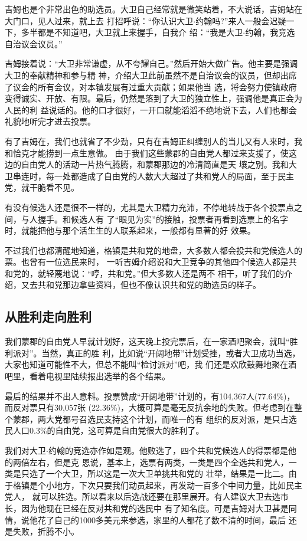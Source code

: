 ﻿\documentclass[11pt]{article}
\begin{document}
吉姆也是个非常出色的助选员。大卫自己经常就是微笑站着，不大说话，吉姆站在大门口，见人过来，就上去
打招呼说：``你认识大卫$\cdot$约翰吗?''来人一般会迟疑一下，多半都是不知道吧，大卫就上来握手，自我介
绍：``我是大卫$\cdot$约翰，我竞选自治议会议员。''

吉姆接着说：``大卫非常谦虚，从不夸耀自己。''然后开始大做广告。他主要是强调大卫的奉献精神和参与精
神，介绍大卫此前虽然不是自治议会的议员，但却出席了议会的所有会议，对本镇发展有过重大贡献；如果他当
选，将会努力使镇政府变得诚实、开放、有限。最后，仍然是落到了大卫的独立性上，强调他是真正会为人民的利
益说话的。他的口才很好，一开口就能滔滔不绝地说下去，人们也都会礼貌地听完才进去投票。

有了吉姆在，我们也就省了不少劲，只有在吉姆正纠缠别人的当儿又有人来时，我和恰克才能捞到一点生意做。
由于我们这些蒙郡的自由党人都过来支援了，使这边的自由党人的活动一片热气腾腾，和蒙郡那边的冷清简直是天
壤之别。我和大卫串连时，每一处都造成了自由党的人数大大超过了共和党人的局面，至于民主党，就干脆看不见。

有没有候选人还是很不一样的，尤其是大卫精力充沛，不停地转战于各个投票点之间，与人握手。和候选人有
了``眼见为实''的接触，投票者再看到选票上的名字时，就能把他与那个活生生的人联系起来，一般都有显著的好
效果。

不过我们也都清醒地知道，格镇是共和党的地盘，大多数人都会投共和党候选人的票。也曾有一位选民来时，
一听吉姆介绍说和大卫竞争的其他四个候选人都是共和党的，就轻蔑地说：``哼，共和党。''但大多数人还是两不
相干，听了我们的介绍，又去共和党那边拿些资料，但也不像认识共和党的助选员的样子。

\subsection{从胜利走向胜利}

我们蒙郡的自由党人早就计划好，这天晚上投完票后，在一家酒吧聚会，就叫``胜利派对''。当然，真正的胜
利，比如说``开阔地带''计划受挫，或者大卫成功当选，大家也知道可能性不大，但总不能叫``检讨派对''吧，我
们还是欢欣鼓舞地聚在酒吧里，看着电视里陆续报出选举的各个结果。

最后的结果并不出人意料。投票赞成``开阔地带''计划的，有104,367人(77.64\%)，而反对票只有30,057张
(22.36\%)，大概可算是毫无反抗余地的失败。但考虑到在整个蒙郡，两大党都号召选民支持这个计划，而唯一的有
组织的反对派，是只占选民人口0.3\%的自由党，这可算是自由党很大的胜利了。

我们对大卫$\cdot$约翰的竞选亦作如是观。他败选了，四个共和党候选人的得票都是他的两倍左右，但是克
恩说，基本上，选票有两类，一类是四个全选共和党人，一类是只选了一个大卫，所以这是一次大卫单挑共和党的
壮举，结果是一比二。由于格镇是个小地方，下次只要我们动员起来，再发动一百多个中间力量，比如民主党人，
就可以胜选。所以看来以后选战还要在那里展开。有人建议大卫去选市长，因为他现在已经在反对共和党的选民中
有了知名度。可是吉姆对大卫甚是同情，说他花了自己的1000多美元来参选，家里的人都花了数不清的时间，最后
还是失败，折腾不小。
\end{document}
